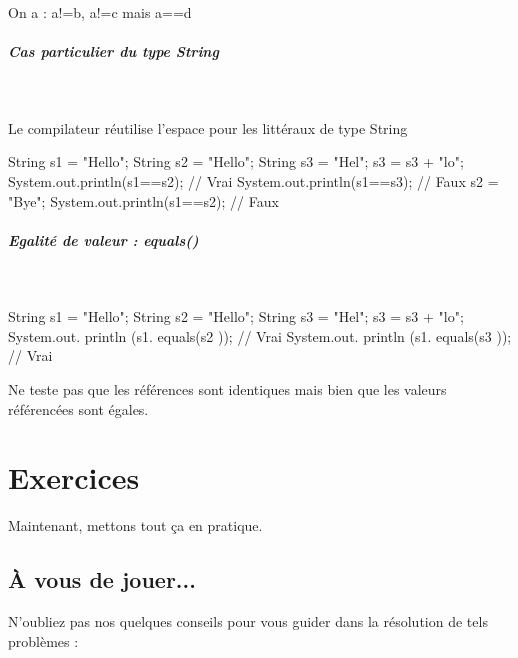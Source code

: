 \documentclass[11pt,a4paper]{article}
\begin{document}
            \par
        
        On a : a!=b, a!=c mais a==d
      
            \par
        
			
		\subparagraph{Cas particulier du type String} 
		
					\textcolor{white}{.} \par
				
        Le compilateur r\'eutilise l'espace pour les litt\'eraux de type String
      
            \par
        \begin{Java}
String s1 = "Hello";
String s2 = "Hello";
String s3 = "Hel";
s3 = s3 + "lo";
System.out.println(s1==s2); // Vrai
System.out.println(s1==s3); // Faux
s2 = "Bye";
System.out.println(s1==s2); // Faux
      \end{Java}
			
		\subparagraph{Egalit\'e de valeur : equals()} 
		
					\textcolor{white}{.} \par
				
            \par
        \begin{Java}
String s1 = "Hello";
String s2 = "Hello";
String s3 = "Hel";
s3 = s3 + "lo";
System.out. println (s1. equals(s2 )); // Vrai
System.out. println (s1. equals(s3 )); // Vrai
      \end{Java}
      Ne teste pas que les r\'ef\'erences sont identiques mais bien que les valeurs r\'ef\'erenc\'ees sont \'egales.
      
            \par
        \section{Exercices}
				Maintenant, mettons tout \c ca en pratique.
      
            \par
        \subsection{\`A vous de jouer...}
          N'oubliez pas nos quelques conseils pour vous guider dans la r\'esolution de tels probl\`emes :
          
\end{document}
